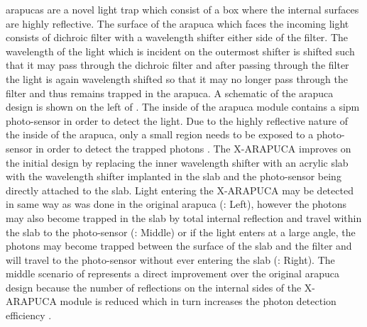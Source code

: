 \glspl{arapuca} are a novel light trap which consist of a box where the internal surfaces are highly reflective. The surface of the \gls{arapuca} which faces the incoming light consists of dichroic filter with a wavelength shifter either side of the filter. The wavelength of the light which is incident on the outermost shifter is shifted such that it may pass through the dichroic filter and after passing through the filter the light is again wavelength shifted so that it may no longer pass through the filter and thus remains trapped in the \gls{arapuca}. A schematic of the \gls{arapuca} design is shown on the left of . The inside of the \gls{arapuca} module contains a \gls{sipm} photo-sensor in order to detect the light. Due to the highly reflective nature of the inside of the \gls{arapuca}, only a small region needs to be exposed to a photo-sensor in order to detect the trapped photons \cite{ARAPUCA}. The X-ARAPUCA improves on the initial design by replacing the inner wavelength shifter with an acrylic slab with the wavelength shifter implanted in the slab and the photo-sensor being directly attached to the slab. Light entering the X-ARAPUCA may be detected in same way as was done in the original \gls{arapuca} (: Left), however the photons may also become trapped in the slab by total internal reflection and travel within the slab to the photo-sensor (: Middle) or if the light enters at a large angle, the photons may become trapped between the surface of the slab and the filter and will travel to the photo-sensor without ever entering the slab (: Right). The middle scenario of  represents a direct improvement over the original \gls{arapuca} design because the number of reflections on the internal sides of the X-ARAPUCA module is reduced which in turn increases the photon detection efficiency \cite{X-ARAPUCA}. 

